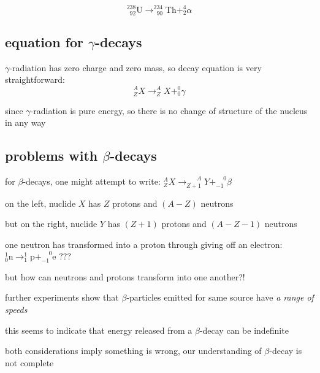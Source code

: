 \begin{equation*}
	_{\phantom{0}92}^{238} \text{U} \longrightarrow _{\phantom{0}90}^{234} \text{Th} + _2^4\alpha 
\end{equation*}



\subsection*{equation for \texorpdfstring{$\gamma$}{\textgamma}-decays}

$\gamma$-radiation has zero charge and zero mass, so decay equation is very straightforward:
\begin{equation*}
\boxed{_Z^A X \longrightarrow _{Z}^{A} X + _0^0\gamma}
\end{equation*}

since $\gamma$-radiation is pure energy, so there is no change of structure of the nucleus in any way



\subsection*{problems with \texorpdfstring{$\beta$}{\textbeta}-decays}

for $\beta$-decays, one might attempt to write: $
	_Z^A X \longrightarrow _{Z+1}^{\phantom{1+}A} Y + _{-1}^{\phantom{+}0}\beta$ 

on the left, nuclide $X$ has $Z$ protons and $(A-Z)$ neutrons

but on the right, nuclide $Y$ has $(Z+1)$ protons and $(A-Z-1)$ neutrons

one neutron has transformed into a proton through giving off an electron: $_0^1 \text{n} \longrightarrow _1^1 \text{p} + _{-1}^{\phantom{+}0}\text{e} \,\, \text{???}$

but how can neutrons and protons transform into one another?!

further experiments show that $\beta$-particles emitted for same source have \emph{a range of speeds}

this seems to indicate that energy released from a $\beta$-decay can be indefinite

both considerations imply something is wrong, our understanding of $\beta$-decay is not complete

